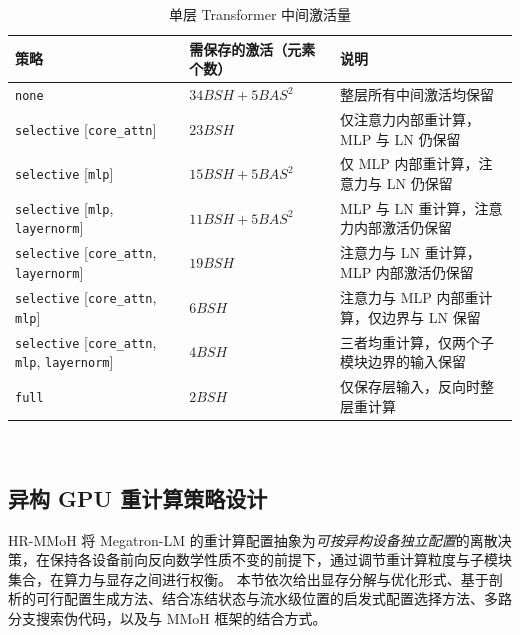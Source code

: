 \begin{table}[htbp]
  \centering
  \caption{单层 Transformer 中间激活量}
  \label{tab:chap4-activation}
  \small
  \renewcommand{\arraystretch}{1.5}
  \setlength{\tabcolsep}{4pt}
  \begin{tabular}{@{}p{2.5cm}p{4.2cm}p{5.8cm}@{}}
    \toprule
    \textbf{策略} & \textbf{需保存的激活（元素个数）} & \textbf{说明} \\
    \midrule
    \texttt{none} & $34 B S H + 5 B A S^2$ & 整层所有中间激活均保留 \\
    \hdashline
    \texttt{selective} [\texttt{core\_attn}] & $23 B S H$ & 仅注意力内部重计算，MLP 与 LN 仍保留 \\
    \hdashline
    \texttt{selective} [\texttt{mlp}] & $15 B S H + 5 B A S^2$ & 仅 MLP 内部重计算，注意力与 LN 仍保留 \\
    \hdashline
    \texttt{selective} [\texttt{mlp}, \texttt{layernorm}] & $11 B S H + 5 B A S^2$ & MLP 与 LN 重计算，注意力内部激活仍保留 \\
    \hdashline
    \texttt{selective} [\texttt{core\_attn}, \texttt{layernorm}] & $19 B S H$ & 注意力与 LN 重计算，MLP 内部激活仍保留 \\
    \hdashline
    \texttt{selective} [\texttt{core\_attn}, \texttt{mlp}] & $6 B S H$ & 注意力与 MLP 内部重计算，仅边界与 LN 保留 \\
    \hdashline
    \texttt{selective} [\texttt{core\_attn}, \texttt{mlp}, \texttt{layernorm}] & $4 B S H$ & 三者均重计算，仅两个子模块边界的输入保留 \\
    \hdashline
    \texttt{full} & $2 B S H$ & 仅保存层输入，反向时整层重计算 \\
    \bottomrule
  \end{tabular}\\
  \renewcommand{\arraystretch}{1.0}
  \vspace{2pt}
\end{table}

\subsection{异构 GPU 重计算策略设计}
\label{sec:HR-MMoH-design}

HR-MMoH 将 Megatron-LM 的重计算配置抽象为\emph{可按异构设备独立配置}的离散决策，在保持各设备前向反向数学性质不变的前提下，通过调节重计算粒度与子模块集合，在算力与显存之间进行权衡。
本节依次给出显存分解与优化形式、基于剖析的可行配置生成方法、结合冻结状态与流水级位置的启发式配置选择方法、多路分支搜索伪代码，以及与 MMoH 框架的结合方式。

